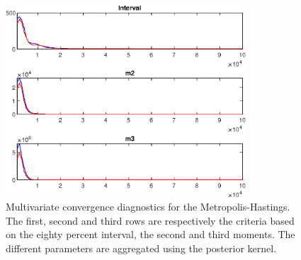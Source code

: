 
\begin{figure}[H]
\centering 
\includegraphics[width=0.8\textwidth]{BRS_growth_sep/Output/BRS_growth_sep_mdiag}
\caption{Multivariate convergence diagnostics for the Metropolis-Hastings.
The first, second and third rows are respectively the criteria based on
the eighty percent interval, the second and third moments. The different 
parameters are aggregated using the posterior kernel.}\label{Fig:MultivariateDiagnostics}
\end{figure}

